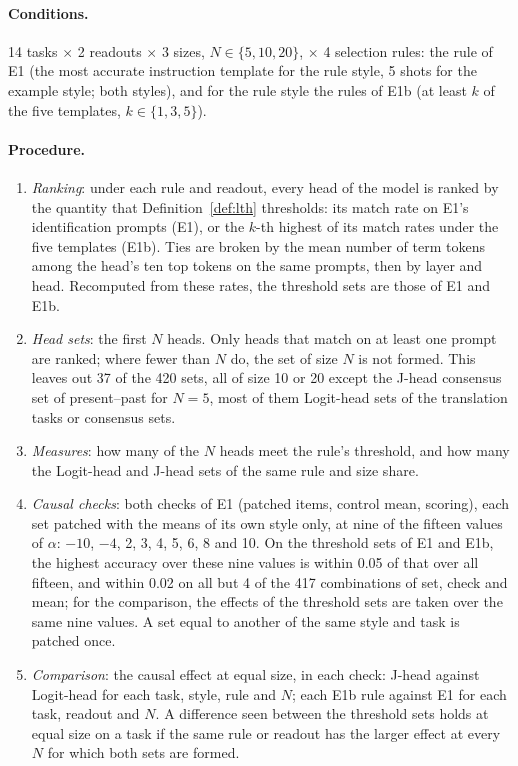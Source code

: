 \documentclass[11pt,a4paper]{article}
\begin{document}
\paragraph{Conditions.} 14 tasks $\times$ 2 readouts $\times$ 3 sizes, $N\in\{5,10,20\}$, $\times$ 4 selection rules: the rule of E1 (the most accurate instruction template for the rule style, 5 shots for the example style; both styles), and for the rule style the rules of E1b (at least $k$ of the five templates, $k\in\{1,3,5\}$).

\paragraph{Procedure.}
\begin{enumerate}
\item \emph{Ranking}: under each rule and readout, every head of the model is ranked by the quantity that Definition~\ref{def:lth} thresholds: its match rate on E1's identification prompts (E1), or the $k$-th highest of its match rates under the five templates (E1b). Ties are broken by the mean number of term tokens among the head's ten top tokens on the same prompts, then by layer and head. Recomputed from these rates, the threshold sets are those of E1 and E1b.
\item \emph{Head sets}: the first $N$ heads. Only heads that match on at least one prompt are ranked; where fewer than $N$ do, the set of size $N$ is not formed. This leaves out 37 of the 420 sets, all of size 10 or 20 except the J-head consensus set of present--past for $N=5$, most of them Logit-head sets of the translation tasks or consensus sets.
\item \emph{Measures}: how many of the $N$ heads meet the rule's threshold, and how many the Logit-head and J-head sets of the same rule and size share.
\item \emph{Causal checks}: both checks of E1 (patched items, control mean, scoring), each set patched with the means of its own style only, at nine of the fifteen values of $\alpha$: $-10$, $-4$, 2, 3, 4, 5, 6, 8 and 10. On the threshold sets of E1 and E1b, the highest accuracy over these nine values is within 0.05 of that over all fifteen, and within 0.02 on all but 4 of the 417 combinations of set, check and mean; for the comparison, the effects of the threshold sets are taken over the same nine values. A set equal to another of the same style and task is patched once.
\item \emph{Comparison}: the causal effect at equal size, in each check: J-head against Logit-head for each task, style, rule and $N$; each E1b rule against E1 for each task, readout and $N$. A difference seen between the threshold sets holds at equal size on a task if the same rule or readout has the larger effect at every $N$ for which both sets are formed.
\end{enumerate}
\end{document}
